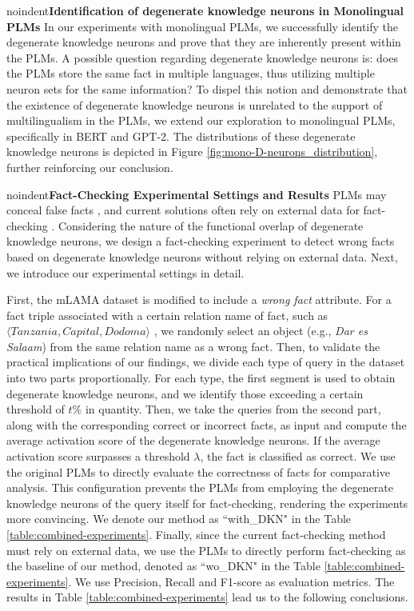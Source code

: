 \documentclass[]{article}
\newcommand{\vpara}[1]{noindent\textbf{#1 }}%
\begin{document}
\vpara{Identification of degenerate knowledge neurons in Monolingual PLMs}
In our experiments with monolingual PLMs, we successfully identify the degenerate knowledge neurons and prove that they are inherently present within the PLMs.
A possible question regarding degenerate knowledge neurons is: does the PLMs store the same fact in multiple languages, thus utilizing multiple neuron sets for the same information? To dispel this notion and demonstrate that the existence of degenerate knowledge neurons is unrelated to the support of multilingualism in the PLMs, we extend our exploration to monolingual PLMs, specifically in BERT and GPT-2. The distributions of these degenerate knowledge neurons is depicted in Figure \ref{fig:mono-D-neurons_distribution}, further reinforcing our conclusion.

\vpara{Fact-Checking Experimental Settings and Results}
PLMs may conceal false facts \cite{hallucination_chatgpt1,hallucination_chatgpt2}, and current solutions often rely on external data for fact-checking \cite{fact-checking-survey}.
Considering the nature of the functional overlap of degenerate knowledge neurons, we design a fact-checking experiment to detect wrong facts based on degenerate knowledge neurons without relying on external data. Next, we introduce our experimental settings in detail.

First, the mLAMA dataset is modified to include a \textit{wrong fact} attribute.
For a fact triple associated with a certain relation name of fact, such as $\langle \textit{Tanzania}, \textit{Capital}, \textit{Dodoma} \rangle$ , we randomly select an object (e.g., \textit{Dar es Salaam}) from the same relation name as a wrong fact.
Then, to validate the practical implications of our findings, we divide each type of query in the dataset into two parts proportionally. For each type, the first segment is used to obtain degenerate knowledge neurons, and we identify those exceeding a certain threshold of \( t\% \) in quantity.
Then, we take the queries from the second part, along with the corresponding correct or incorrect facts, as input and compute the average activation score of the degenerate knowledge neurons. If the average activation score surpasses a threshold $\lambda$, the fact is classified as correct.
We use the original PLMs to directly evaluate the correctness of facts for comparative analysis. This configuration prevents the PLMs from employing the degenerate knowledge neurons of the query itself for fact-checking, rendering the experiments more convincing. We denote our method as ``with\_DKN" in the Table \ref{table:combined-experiments}.
Finally, since the current fact-checking method must rely on external data, we use the PLMs to directly perform fact-checking as the baseline of our method, denoted as ``wo\_DKN" in the Table \ref{table:combined-experiments}. We use Precision, Recall and F1-score as evaluation metrics.  The results in Table \ref{table:combined-experiments} lead us to the following conclusions.
\end{document}

